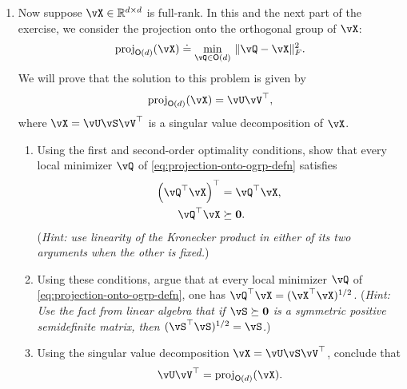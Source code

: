 \documentclass[../../book-main.tex]{subfiles}
\begin{document}
\begin{exercise}
\begin{enumerate}
        \item Now suppose $\vX \in \R^{d\times d}$ is full-rank. In this and the next part of the exercise, we consider the projection onto the orthogonal group of $\vX$:
        \begin{equation}\label{eq:projection-onto-ogrp-defn}
            \mathrm{proj}_{\O(d)}(\vX) \doteq
            \min_{\vQ \in \O(d)
            }\, \norm{\vQ - \vX}_F^2.
        \end{equation}
        We will prove that the solution to this problem is given by
        \begin{equation*}
            \mathrm{proj}_{\O(d)}(\vX)
            =
            \vU \vV^\top,
        \end{equation*}
        where $\vX = \vU \vS \vV^\top$ is a singular value decomposition of $\vX$. 

        \begin{enumerate}
            \item Using the first and second-order optimality conditions, show that every local minimizer $\vQ$ of \eqref{eq:projection-onto-ogrp-defn} satisfies
            \begin{align*}
                \left( \vQ^\top \vX \right)^\top &= \vQ^\top \vX, \\
                \vQ^\top \vX &\succeq \mathbf{0}.
            \end{align*}
            (\textit{Hint: use linearity of the Kronecker product in either of its two arguments when the other is fixed.})
            \item Using these conditions, argue that at every local minimizer $\vQ$ of \eqref{eq:projection-onto-ogrp-defn}, one has $\vQ^\top \vX = (\vX^\top \vX)^{1/2}$.
            (\textit{Hint: Use %
            the fact from linear algebra that if $\vS \succeq \mathbf{0}$ is a symmetric positive semidefinite matrix, then $(\vS^\top\vS)^{1/2} = \vS$.})
            \item Using the singular value decomposition $\vX = \vU \vS \vV^\top$, conclude that
            \begin{equation*}
                \vU \vV^\top
                =
                \mathrm{proj}_{\O(d)}(\vX).
            \end{equation*}
        \end{enumerate}
    \end{enumerate}
\end{exercise}
\end{document}
